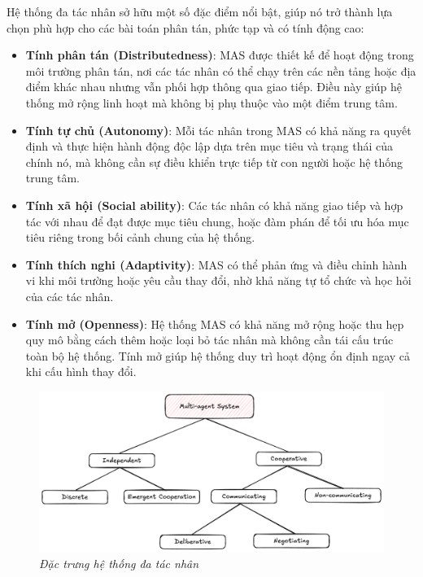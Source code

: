 \documentclass{article}
\begin{document}
Hệ thống đa tác nhân sở hữu một số đặc điểm nổi bật, giúp nó trở thành lựa chọn phù hợp cho các bài toán phân tán, phức tạp và có tính động cao:
\begin{itemize}[topsep=0pt, itemsep=2pt, leftmargin=40pt]
    \item \textbf{Tính phân tán (Distributedness)}: MAS được thiết kế để hoạt động trong môi trường phân tán, nơi các tác nhân có thể chạy trên các nền tảng hoặc địa điểm khác nhau nhưng vẫn phối hợp thông qua giao tiếp. Điều này giúp hệ thống mở rộng linh hoạt mà không bị phụ thuộc vào một điểm trung tâm.
    \item \textbf{Tính tự chủ (Autonomy)}: Mỗi tác nhân trong MAS có khả năng ra quyết định và thực hiện hành động độc lập dựa trên mục tiêu và trạng thái của chính nó, mà không cần sự điều khiển trực tiếp từ con người hoặc hệ thống trung tâm.
    \item \textbf{Tính xã hội (Social ability)}: Các tác nhân có khả năng giao tiếp và hợp tác với nhau để đạt được mục tiêu chung, hoặc đàm phán để tối ưu hóa mục tiêu riêng trong bối cảnh chung của hệ thống.
    \item \textbf{Tính thích nghi (Adaptivity)}: MAS có thể phản ứng và điều chỉnh hành vi khi môi trường hoặc yêu cầu thay đổi, nhờ khả năng tự tổ chức và học hỏi của các tác nhân.
    \item \textbf{Tính mở (Openness)}: Hệ thống MAS có khả năng mở rộng hoặc thu hẹp quy mô bằng cách thêm hoặc loại bỏ tác nhân mà không cần tái cấu trúc toàn bộ hệ thống. Tính mở giúp hệ thống duy trì hoạt động ổn định ngay cả khi cấu hình thay đổi.
\end{itemize}

\begin{figure}[H]
    \centering
    \includegraphics[width=1\linewidth]{img/mas-characteristics.png}
    \caption{\centering\textit{Đặc trưng hệ thống đa tác nhân}}
    \label{fig:mas-characteristics}
\end{figure}
\end{document}

